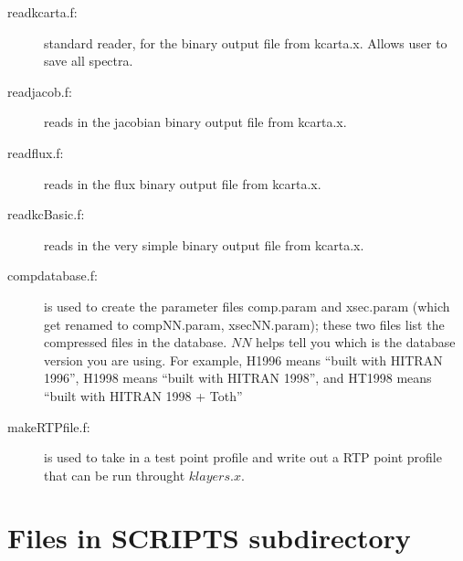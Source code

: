 \documentclass[11pt]{article}
\begin{document}
\begin{description}

\item[readkcarta.f:] standard reader, for the binary output file from
  kcarta.x. Allows user to save all spectra.

\item[readjacob.f:] reads in the jacobian binary output file from
  kcarta.x.  

\item[readflux.f:] reads in the flux binary output file from
  kcarta.x.  

\item[readkcBasic.f:] reads in the very simple binary output file from
  kcarta.x.  

\item[compdatabase.f:] is used to create the parameter files comp.param 
 and xsec.param (which get renamed to compNN.param, xsecNN.param); these two
 files list the compressed files in the database. $NN$ helps tell you which
 is the database version you are using. For example, H1996  means 
 ``built with HITRAN 1996'', H1998  means ``built with HITRAN 1998'', 
 and HT1998 means ``built with HITRAN 1998 + Toth''

\item[makeRTPfile.f:] is used to take in a test point profile and write out
 a RTP point profile that can be run throught $klayers.x$.
\end{description}

\section{Files in SCRIPTS subdirectory}
\end{document}
